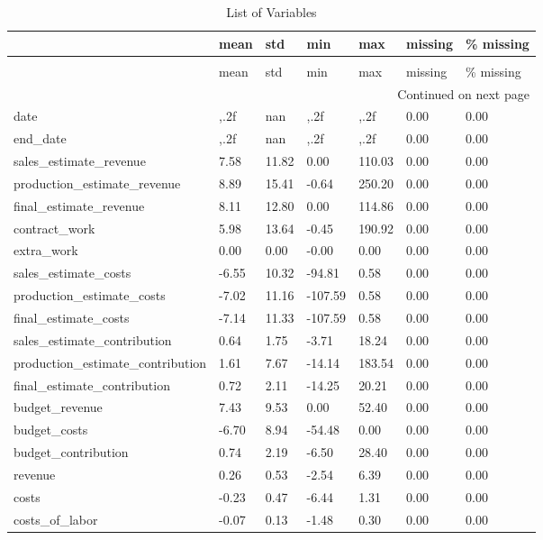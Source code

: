 \begin{landscape}\begin{longtable}[h!]{lllllll}
\caption{List of Variables} \label{eda_1} \\
\toprule
 & mean & std & min & max & missing & \% missing \\
\midrule
\endfirsthead
\caption[]{List of Variables} \\
\toprule
 & mean & std & min & max & missing & \% missing \\
\midrule
\endhead
\midrule
\multicolumn{7}{r}{Continued on next page} \\
\midrule
\endfoot
\bottomrule
\endlastfoot
date & ,.2f & nan & ,.2f & ,.2f & 0.00 & 0.00 \\
end_date & ,.2f & nan & ,.2f & ,.2f & 0.00 & 0.00 \\
sales_estimate_revenue & 7.58 & 11.82 & 0.00 & 110.03 & 0.00 & 0.00 \\
production_estimate_revenue & 8.89 & 15.41 & -0.64 & 250.20 & 0.00 & 0.00 \\
final_estimate_revenue & 8.11 & 12.80 & 0.00 & 114.86 & 0.00 & 0.00 \\
contract_work & 5.98 & 13.64 & -0.45 & 190.92 & 0.00 & 0.00 \\
extra_work & 0.00 & 0.00 & -0.00 & 0.00 & 0.00 & 0.00 \\
sales_estimate_costs & -6.55 & 10.32 & -94.81 & 0.58 & 0.00 & 0.00 \\
production_estimate_costs & -7.02 & 11.16 & -107.59 & 0.58 & 0.00 & 0.00 \\
final_estimate_costs & -7.14 & 11.33 & -107.59 & 0.58 & 0.00 & 0.00 \\
sales_estimate_contribution & 0.64 & 1.75 & -3.71 & 18.24 & 0.00 & 0.00 \\
production_estimate_contribution & 1.61 & 7.67 & -14.14 & 183.54 & 0.00 & 0.00 \\
final_estimate_contribution & 0.72 & 2.11 & -14.25 & 20.21 & 0.00 & 0.00 \\
budget_revenue & 7.43 & 9.53 & 0.00 & 52.40 & 0.00 & 0.00 \\
budget_costs & -6.70 & 8.94 & -54.48 & 0.00 & 0.00 & 0.00 \\
budget_contribution & 0.74 & 2.19 & -6.50 & 28.40 & 0.00 & 0.00 \\
revenue & 0.26 & 0.53 & -2.54 & 6.39 & 0.00 & 0.00 \\
costs & -0.23 & 0.47 & -6.44 & 1.31 & 0.00 & 0.00 \\
costs_of_labor & -0.07 & 0.13 & -1.48 & 0.30 & 0.00 & 0.00 \\

\end{longtable}
\end{landscape}
